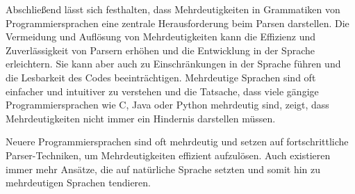 \documentclass[runningheads]{llncs}
\begin{document}
	Abschließend lässt sich festhalten, dass Mehrdeutigkeiten in Grammatiken von Programmiersprachen
	eine zentrale Herausforderung beim Parsen darstellen.
	Die Vermeidung und Auflösung von Mehrdeutigkeiten kann die Effizienz und Zuverlässigkeit von Parsern erhöhen
	und die Entwicklung in der Sprache erleichtern.
	Sie kann aber auch zu Einschränkungen in der Sprache führen und die Lesbarkeit des Codes beeinträchtigen.
	Mehrdeutige Sprachen sind oft einfacher und intuitiver zu verstehen
	und die Tatsache, dass viele gängige Programmiersprachen wie C, Java oder Python mehrdeutig sind,
	zeigt, dass Mehrdeutigkeiten nicht immer ein Hindernis darstellen müssen.

	Neuere Programmiersprachen sind oft mehrdeutig und setzen auf fortschrittliche Parser-Techniken,
	um Mehrdeutigkeiten effizient aufzulösen.
	Auch existieren immer mehr Ansätze, die auf natürliche Sprache setzten
	und somit hin zu mehrdeutigen Sprachen tendieren.
	\cite{watrous2020,springer2013,wharton1976,watrous,parr,kemp1974,qi2018generalized,softwarelanguage,thorup1994}


%
%
%
	
	
\end{document}
